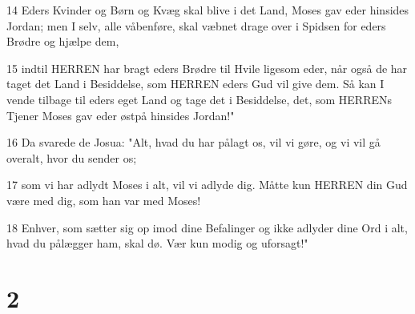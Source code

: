 \par 14 Eders Kvinder og Børn og Kvæg skal blive i det Land, Moses gav eder hinsides Jordan; men I selv, alle våbenføre, skal væbnet drage over i Spidsen for eders Brødre og hjælpe dem,
\par 15 indtil HERREN har bragt eders Brødre til Hvile ligesom eder, når også de har taget det Land i Besiddelse, som HERREN eders Gud vil give dem. Så kan I vende tilbage til eders eget Land og tage det i Besiddelse, det, som HERRENs Tjener Moses gav eder østpå hinsides Jordan!"
\par 16 Da svarede de Josua: "Alt, hvad du har pålagt os, vil vi gøre, og vi vil gå overalt, hvor du sender os;
\par 17 som vi har adlydt Moses i alt, vil vi adlyde dig. Måtte kun HERREN din Gud være med dig, som han var med Moses!
\par 18 Enhver, som sætter sig op imod dine Befalinger og ikke adlyder dine Ord i alt, hvad du pålægger ham, skal dø. Vær kun modig og uforsagt!"

\chapter{2}

